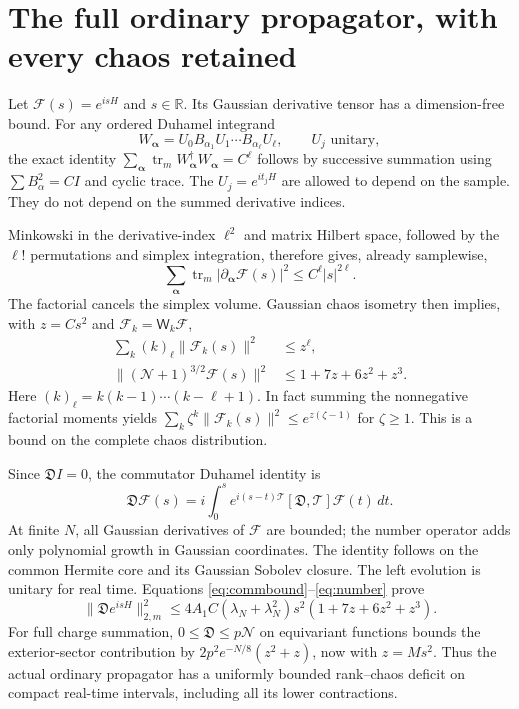 \documentclass[11pt,a4paper]{article}
\newcommand{\tr}{\operatorname{tr}}
\newcommand{\W}{\mathsf W}
\begin{document}
\newpage
\section{The full ordinary propagator, with every chaos retained}
Let $\mathcal F(s)=e^{isH}$ and $s\in\mathbb R$. Its Gaussian
derivative tensor has a dimension-free bound. For any ordered
Duhamel integrand
\begin{equation}
 W_{\boldsymbol\alpha}=U_0B_{\alpha_1}U_1\cdots B_{\alpha_\ell}U_\ell,
 \qquad U_j\text{ unitary},
\end{equation}
the exact identity
$\sum_{\boldsymbol\alpha}\tr_m W_{\boldsymbol\alpha}^\dagger
W_{\boldsymbol\alpha}=C^\ell$ follows by successive summation
using $\sum B_\alpha^2=CI$ and cyclic trace. The $U_j=e^{it_jH}$
are allowed to depend on the sample. They do not depend on the
summed derivative indices.

Minkowski in the derivative-index $\ell^2$ and matrix Hilbert
space, followed by the $\ell!$ permutations and simplex integration,
therefore gives, already samplewise,
\begin{equation}
 \sum_{\boldsymbol\alpha}\tr_m
 |\partial_{\boldsymbol\alpha}\mathcal F(s)|^2
 \le C^\ell|s|^{2\ell}.\label{eq:derivatives}
\end{equation}
The factorial cancels the simplex volume. Gaussian chaos isometry
then implies, with $z=Cs^2$ and $\mathcal F_k=\W_k\mathcal F$,
\begin{align}
 \sum_k(k)_\ell\|\mathcal F_k(s)\|^2&\le z^\ell,\\
 \|(\mathcal N+1)^{3/2}\mathcal F(s)\|^2
 &\le1+7z+6z^2+z^3.\label{eq:number}
\end{align}
Here $(k)_\ell=k(k-1)\cdots(k-\ell+1)$. In fact summing the
nonnegative factorial moments yields
$\sum_k\zeta^k\|\mathcal F_k(s)\|^2\le e^{z(\zeta-1)}$ for
$\zeta\ge1$. This is a bound on the complete chaos distribution.

Since $\mathfrak D I=0$, the commutator Duhamel identity is
\begin{equation}
 \mathfrak D\mathcal F(s)
 =i\int_0^s e^{i(s-t)\mathcal T}
       [\mathfrak D,\mathcal T]\mathcal F(t)\,dt.
\end{equation}
At finite $N$, all Gaussian derivatives of $\mathcal F$ are bounded;
the number operator adds only polynomial growth in Gaussian coordinates.
The identity follows on the common Hermite core and its Gaussian
Sobolev closure. The left evolution is unitary for real time.
Equations \eqref{eq:commbound}--\eqref{eq:number} prove
\begin{equation}
 \boxed{\ \|\mathfrak D e^{isH}\|_{2,m}^2
 \le4A_1C(\lambda_N+\lambda_N^2)s^2(1+7z+6z^2+z^3).\ }
 \label{eq:ordinary}
\end{equation}
For full charge summation, $0\le\mathfrak D\le p\mathcal N$
on equivariant functions bounds the exterior-sector contribution by
$2p^2e^{-N/8}(z^2+z)$, now with $z=Ms^2$. Thus the actual ordinary
propagator has a uniformly bounded rank--chaos deficit on compact
real-time intervals, including all its lower contractions.
\end{document}
